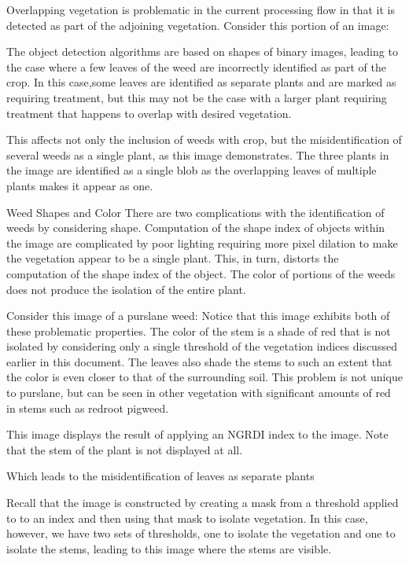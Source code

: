 \documentclass[letterpaper]{article}
\begin{document}
Overlapping vegetation is problematic in the current processing flow in that it is detected as part of the adjoining vegetation.  Consider this portion of an image:



The object detection algorithms are based on shapes of binary images, leading to the case where a few leaves of the weed are incorrectly identified as part of the crop. In this case,some leaves are identified as separate plants and are marked as requiring treatment, but this may not be the case with a larger plant requiring treatment that happens to overlap with desired vegetation.



This affects not only the inclusion of weeds with crop, but the misidentification of several weeds as a single plant, as this image demonstrates.  The three plants in the image are identified as a single blob as the overlapping leaves of multiple plants makes it appear as one.



Weed Shapes and Color
There are two complications with the identification of weeds by considering shape.  Computation of the shape index of objects within the image are complicated by poor lighting requiring more pixel dilation to make the vegetation appear to be a single plant. This, in turn, distorts the computation of the shape index of the object. The color of portions of the weeds does not produce the isolation of the entire plant.

Consider this image of a purslane weed:
Notice that this image exhibits both of these problematic properties. The color of the stem is a shade of red that is not isolated by considering only a single threshold of the vegetation indices discussed earlier in this document. The leaves also shade the stems to such an extent that the color is even closer to that of the surrounding soil. This problem is not unique to purslane, but can be seen in other vegetation with significant amounts of red in stems such as redroot pigweed.




This image displays the result of applying an NGRDI index to the image. Note that the stem of the plant is not displayed at all.


Which leads to the misidentification of leaves as separate plants



Recall that the image is constructed by creating a mask from a threshold applied to to an index and then using that mask to isolate vegetation. In this case, however, we have two sets of thresholds, one to isolate the vegetation and one to isolate the stems, leading to this image where the stems are visible.
\end{document}
